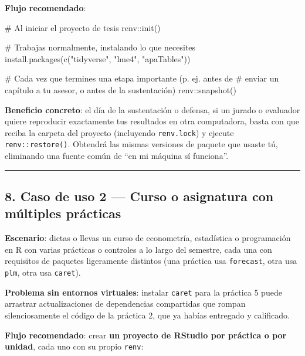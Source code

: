 \documentclass[
  man,
  floatsintext,
  longtable,
  a4paper,
  nolmodern,
  notxfonts,
  notimes,
  12pt,
  colorlinks=true,linkcolor=blue,citecolor=blue,urlcolor=blue]{apa7}
\newenvironment{Shaded}{\begin{snugshade}}{\end{snugshade}}
\newcommand{\CommentTok}[1]{\textcolor[rgb]{0.37,0.37,0.37}{#1}}
\newcommand{\FunctionTok}[1]{\textcolor[rgb]{0.28,0.35,0.67}{#1}}
\newcommand{\NormalTok}[1]{\textcolor[rgb]{0.00,0.23,0.31}{#1}}
\newcommand{\SpecialCharTok}[1]{\textcolor[rgb]{0.37,0.37,0.37}{#1}}
\newcommand{\StringTok}[1]{\textcolor[rgb]{0.13,0.47,0.30}{#1}}
\begin{document}
\textbf{Flujo recomendado}:

\begin{Shaded}
\begin{Highlighting}[]
\CommentTok{\# Al iniciar el proyecto de tesis}
\NormalTok{renv}\SpecialCharTok{::}\FunctionTok{init}\NormalTok{()}

\CommentTok{\# Trabajas normalmente, instalando lo que necesites}
\FunctionTok{install.packages}\NormalTok{(}\FunctionTok{c}\NormalTok{(}\StringTok{"tidyverse"}\NormalTok{, }\StringTok{"lme4"}\NormalTok{, }\StringTok{"apaTables"}\NormalTok{))}

\CommentTok{\# Cada vez que termines una etapa importante (p. ej. antes de}
\CommentTok{\# enviar un capítulo a tu asesor, o antes de la sustentación)}
\NormalTok{renv}\SpecialCharTok{::}\FunctionTok{snapshot}\NormalTok{()}
\end{Highlighting}
\end{Shaded}

\textbf{Beneficio concreto}: el día de la sustentación o defensa, si un
jurado o evaluador quiere reproducir exactamente tus resultados en otra
computadora, basta con que reciba la carpeta del proyecto (incluyendo
\texttt{renv.lock}) y ejecute \texttt{renv::restore()}. Obtendrá las
mismas versiones de paquete que usaste tú, eliminando una fuente común
de ``en mi máquina sí funciona''.

\begin{center}\rule{0.5\linewidth}{0.5pt}\end{center}

\subsection{8. Caso de uso 2 --- Curso o asignatura con múltiples
prácticas}\label{caso-de-uso-2-curso-o-asignatura-con-muxfaltiples-pruxe1cticas}

\textbf{Escenario}: dictas o llevas un curso de econometría, estadística
o programación en R con varias prácticas o controles a lo largo del
semestre, cada una con requisitos de paquetes ligeramente distintos (una
práctica usa \texttt{forecast}, otra usa \texttt{plm}, otra usa
\texttt{caret}).

\textbf{Problema sin entornos virtuales}: instalar \texttt{caret} para
la práctica 5 puede arrastrar actualizaciones de dependencias
compartidas que rompan silenciosamente el código de la práctica 2, que
ya habías entregado y calificado.

\textbf{Flujo recomendado}: crear \textbf{un proyecto de RStudio por
práctica o por unidad}, cada uno con su propio \texttt{renv}:
\end{document}
